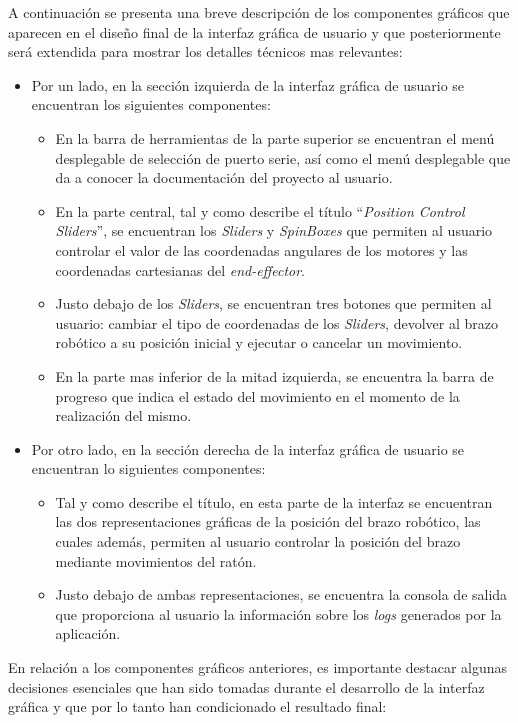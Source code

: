 A continuación se presenta una breve descripción de los componentes gráficos que aparecen en el diseño final de la interfaz gráfica de usuario y que posteriormente será extendida para mostrar los detalles técnicos mas relevantes:
\begin{itemize}
    \item Por un lado, en la sección izquierda de la interfaz gráfica de usuario se encuentran los siguientes componentes:
    \begin{itemize}
        \item En la barra de herramientas de la parte superior se encuentran el menú desplegable de selección de puerto serie, así como el menú desplegable que da a conocer la documentación del proyecto al usuario.
        \item En la parte central, tal y como describe el título ``\textit{Position Control Sliders}'', se encuentran los \textit{Sliders} y \textit{SpinBoxes} que permiten al usuario controlar el valor de las coordenadas angulares de los motores y las coordenadas cartesianas del \textit{end-effector}.
        \item Justo debajo de los \textit{Sliders}, se encuentran tres botones que permiten al usuario: cambiar el tipo de coordenadas de los \textit{Sliders}, devolver al brazo robótico a su posición inicial y ejecutar o cancelar un movimiento.
        \item En la parte mas inferior de la mitad izquierda, se encuentra la barra de progreso que indica el estado del movimiento en el momento de la realización del mismo.
    \end{itemize}
    \item Por otro lado, en la sección derecha de la interfaz gráfica de usuario se encuentran lo siguientes componentes:
    \begin{itemize}
        \item Tal y como describe el título, en esta parte de la interfaz se encuentran las dos representaciones gráficas de la posición del brazo robótico, las cuales además, permiten al usuario controlar la posición del brazo mediante movimientos del ratón.
        \item Justo debajo de ambas representaciones, se encuentra la consola de salida que proporciona al usuario la información sobre los \textit{logs} generados por la aplicación.
    \end{itemize}
\end{itemize}

En relación a los componentes gráficos anteriores, es importante destacar algunas decisiones esenciales que han sido tomadas durante el desarrollo de la interfaz gráfica y que por lo tanto han condicionado el resultado final:

